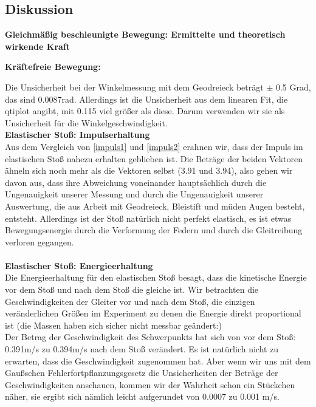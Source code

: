 \documentclass{article}
\begin{document}


\subsection{Diskussion}
\textbf{Gleichmäßig beschleunigte Bewegung: Ermittelte und theoretisch wirkende Kraft}


\textbf{Kräftefreie Bewegung: }

Die Unsicherheit bei der Winkelmessung mit dem Geodreieck beträgt $\pm$ 0.5 Grad, das sind 0.0087rad. Allerdings ist die Unsicherheit aus dem linearen Fit, die qtiplot angibt, mit 0.115 viel größer als diese. Darum verwenden wir sie als Unsicherheit für die Winkelgeschwindigkeit.
\\
\textbf{Elastischer Stoß: Impulserhaltung} \\
Aus dem Vergleich von \ref{impuls1} und \ref{impuls2} erahnen wir, dass der Impuls im elastischen Stoß nahezu erhalten geblieben ist. Die Beträge der beiden Vektoren ähneln sich noch mehr als die Vektoren selbst (3.91 und 3.94), also gehen wir davon aus, dass ihre Abweichung voneinander hauptsächlich durch die Ungenauigkeit unserer Messung und durch die Ungenauigkeit unserer Auswertung, die aus Arbeit mit Geodreieck, Bleistift und müden Augen besteht, entsteht. Allerdings ist der Stoß natürlich nicht perfekt elastisch, es ist etwas Bewegungsenergie durch die Verformung der Federn und durch die Gleitreibung verloren gegangen. \\
\\
\textbf{Elastischer Stoß: Energieerhaltung} \\
Die Energieerhaltung für den elastischen Stoß besagt, dass die kinetische Energie vor dem Stoß und nach dem Stoß die gleiche ist. Wir betrachten die Geschwindigkeiten der Gleiter vor und nach dem Stoß, die einzigen veränderlichen Größen im Experiment zu denen die Energie direkt proportional ist (die Massen haben sich sicher nicht messbar geändert:) \\
Der Betrag der Geschwindigkeit des Schwerpunkts hat sich von vor dem Stoß: 0.391m/s zu 0.394m/s nach dem Stoß verändert. Es ist natürlich nicht zu erwarten, dass die Geschwindigkeit zugenommen hat. Aber wenn wir uns mit dem Gaußschen Fehlerfortpflanzungsgesetz die Unsicherheiten der Beträge der Geschwindigkeiten anschauen, kommen wir der Wahrheit schon ein Stückchen näher, sie ergibt sich nämlich leicht aufgerundet von 0.0007 zu 0.001 m/s.\\
\end{document}
